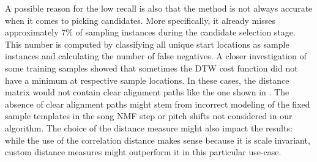 \documentclass{article}
\begin{document}
A possible reason for the low recall is also that the method is not always accurate when it comes to picking candidates. More specifically, it already misses approximately 7\% of sampling instances during the candidate selection stage. This number is computed by classifying all unique start locations as sample instances and calculating the number of false negatives. A closer investigation of some training samples showed that sometimes the DTW cost function did not have a minimum at respective sample locations. In these cases, the distance matrix would not contain clear alignment paths like the one shown in . %
%
The absence of clear alignment paths might stem from incorrect modeling of the fixed sample templates in the song NMF step or pitch shifts not considered in our algorithm. The choice of the distance measure might also impact the results: while the use of the correlation distance makes sense because it is scale invariant, custom distance measures might outperform it in this particular use-case.
\end{document}
